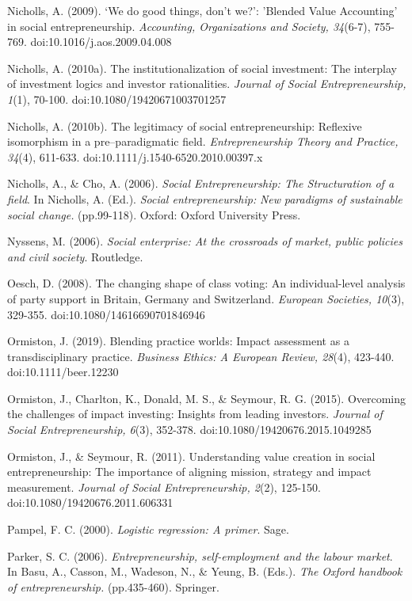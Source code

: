 \documentclass{article}
\begin{document}
Nicholls, A. (2009). ‘We do good things, don't we?': 'Blended Value Accounting' in social entrepreneurship. \emph{Accounting, Organizations and Society, 34}(6-7), 755-769. doi:10.1016/j.aos.2009.04.008

Nicholls, A. (2010a). The institutionalization of social investment: The interplay of investment logics and investor rationalities. \emph{Journal of Social Entrepreneurship, 1}(1), 70-100. doi:10.1080/19420671003701257

Nicholls, A. (2010b). The legitimacy of social entrepreneurship: Reflexive isomorphism in a pre--paradigmatic field. \emph{Entrepreneurship Theory and Practice, 34}(4), 611-633. doi:10.1111/j.1540-6520.2010.00397.x

Nicholls, A., \& Cho, A. (2006). \emph{Social Entrepreneurship: The Structuration of a field}. In Nicholls, A. (Ed.). \emph{Social entrepreneurship: }\emph{New}\emph{ paradigms of sustainable social change.} (pp.99-118). Oxford: Oxford University Press.

Nyssens, M. (2006). \emph{Social enterprise: At the crossroads of market, public policies and} \emph{civil} \emph{society}. Routledge. 

Oesch, D. (2008). The changing shape of class voting: An individual-level analysis of party support in Britain, Germany and Switzerland. \emph{European Societies, 10}(3), 329-355. doi:10.1080/14616690701846946

Ormiston, J. (2019). Blending practice worlds: Impact assessment as a transdisciplinary practice. \emph{Business Ethics: A European Review, 28}(4), 423-440. doi:10.1111/beer.12230 

Ormiston, J., Charlton, K., Donald, M. S., \& Seymour, R. G. (2015). Overcoming the challenges of impact investing: Insights from leading investors. \emph{Journal of Social Entrepreneurship, 6}(3), 352-378. doi:10.1080/19420676.2015.1049285

Ormiston, J., \& Seymour, R. (2011). Understanding value creation in social entrepreneurship: The importance of aligning mission, strategy and impact measurement. \emph{Journal of Social Entrepreneurship, 2}(2), 125-150. doi:10.1080/19420676.2011.606331

Pampel, F. C. (2000). \emph{Logistic regression: A primer}. Sage.

Parker, S. C. (2006). \emph{Entrepreneurship, self-employment and the labour market}. In Basu, A., Casson, M., Wadeson, N., \& Yeung, B. (Eds.). \emph{The} \emph{Oxford handbook of entrepreneurship. }(pp.435-460). Springer. 
\end{document}
